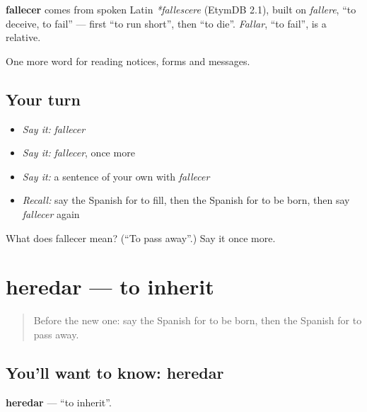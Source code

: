 \begin{cousinweb}
\textbf{fallecer} comes from spoken Latin \emph{*fallescere} (EtymDB 2.1), built on \emph{fallere}, \textquotedblleft{}to deceive, to fail\textquotedblright{} — first \textquotedblleft{}to run short\textquotedblright{}, then \textquotedblleft{}to die\textquotedblright{}. \emph{Fallar}, \textquotedblleft{}to fail\textquotedblright{}, is a relative.
\end{cousinweb}

\begin{grammarlens}[title={What you've built}]
One more word for reading notices, forms and messages.
\end{grammarlens}

\subsection*{Your turn}
\begin{itemize}
\raggedright
  \item \emph{Say it:} \emph{fallecer}
  \item \emph{Say it:} \emph{fallecer}, once more
  \item \emph{Say it:} a sentence of your own with \emph{fallecer}
  \item \emph{Recall:} say the Spanish for to fill, then the Spanish for to be born, then say \emph{fallecer} again
\end{itemize}

\begin{tcolorbox}[breakable,colback=teal!4,colframe=teal!35!black,title={Before you move on}]
What does fallecer mean? (\textquotedblleft{}To pass away\textquotedblright{}.) Say it once more.
\end{tcolorbox}
\section[heredar]{heredar — to inherit}

\label{lesson:ES-C497-heredar}



\begin{quote}
Before the new one: say the Spanish for to be born, then the Spanish for to pass away.
\end{quote}

\subsection*{You'll want to know: heredar}
\textbf{heredar} — \textquotedblleft{}to inherit\textquotedblright{}.

